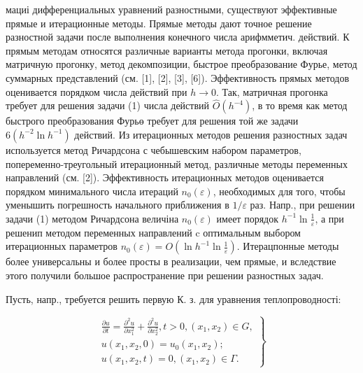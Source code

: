 \documentclass[10pt]{article}
\begin{document}
мациі дифференциальных уравнений разностными, существуют эффективные прямые и итерационные методы. Прямые методы дают точное решение разностной задачи после выполнения конечного числа арифмметич. действий. К прямым методам относятся различные варианты метода прогонки, включая матричную прогонку, метод декомпозиции, быстрое преобразование Фурье, метод суммарных представлений (см. [1], [2], [3], [6]). Эффективность прямых методов оценивается порядком числа действий при $h \rightarrow 0$. Так, матричная прогонка требует для решения задачи (1) числа действий $\widehat{O}\left(h^{-4}\right)$, в то время как метод быстрого преобразования Фурьө требует для решения той же задачи $6\left(h^{-2} \ln h^{-1}\right)$ действий. Из итерационных методов решения разностных задач используется метод Ричардсона с чебышевским набором параметров, попеременно-треугольный итерационный метод, различные методы переменных направлений (см. [2]). Эффективность итерационных методов оценивается порядком минимального числа итераций $n_{0}(\varepsilon)$, необходимых для того, чтобы уменышить погрешность начального приближения в $1 / \varepsilon$ раз. Напр., при решении задачи (1) методом Ричардсона величіна $n_{0}(\varepsilon)$ имеет порядок $h^{-1} \ln \frac{1}{\varepsilon}$, а при решенип методом переменных направлений $\mathrm{c}$ оптимальным выбором итерационных параметров $n_{0}(\varepsilon)=O\left(\ln h^{-1} \ln \frac{1}{\varepsilon}\right)$. Итерацпонные методы более универсальны и более просты в реализации, чем прямые, и вследствие этого получили большое распространение при решении разностных задач.



Пусть, напр., требуется решить первую К. з. для уравнения теплопроводності:



\[

\left.\begin{array}{l}

\frac{\partial u}{\partial t}=\frac{\partial^{2} u}{\partial x_{1}^{2}}+\frac{\partial^{2} u}{\partial x_{2}^{2}}, t>0,\left(x_{1}, x_{2}\right) \in G, \\

u\left(x_{1}, x_{2}, 0\right)=u_{0}\left(x_{1}, x_{2}\right) ; \\

u\left(x_{1}, x_{2}, t\right)=0,\left(x_{1}, x_{2}\right) \in \Gamma .

\end{array}\right\}

\]
\end{document}
